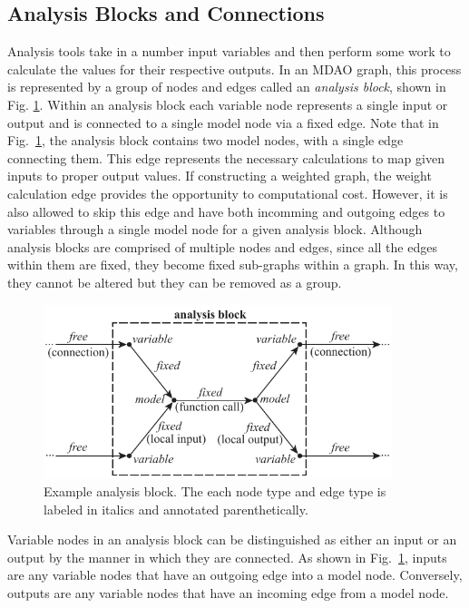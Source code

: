 \subsection{Analysis Blocks and Connections}
\label{ss:analysis blocks and connections}
Analysis tools take in a number input variables and then perform some work to calculate 
the values for their respective outputs. In an MDAO graph, this process is 
represented by a group of nodes and edges called an \emph{analysis block}, 
shown in Fig. \ref{f:analysis block}. Within an analysis block each variable 
node represents a single input or output and is connected 
to a single model node via a fixed edge. Note that in Fig.~\ref{f:analysis block}, 
the analysis block contains two model nodes, with a single edge connecting them. 
This edge represents the necessary calculations to map given inputs 
to proper output values. If constructing a weighted graph, the weight calculation edge 
provides the opportunity to computational cost. However, it is also allowed to skip 
this edge and have both incomming and outgoing edges to variables through a single model 
node for a given analysis block. Although analysis blocks are comprised of multiple nodes and edges, since all 
	the edges within them are fixed, they become fixed sub-graphs within a graph. In this way, they cannot be altered but they can be removed as a group.
\begin{figure}[htb!]
    \begin{center}
    \includegraphics[width=4in]{images/analysis_block}
    \end{center}
    \vspace{-10pt}
\caption{Example analysis block. The each node type and edge type is labeled in italics and annotated parenthetically.}
\label{f:analysis block}
\end{figure}

Variable nodes in an analysis block can be distinguished as either an input or 
an output by the manner in which they are connected. As shown in Fig.~\ref{f:analysis block}, 
inputs are any variable nodes that have an outgoing edge into a model 
node. Conversely, outputs are any variable nodes that have an incoming edge from a model node. 


